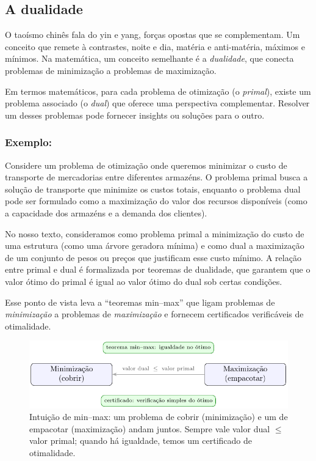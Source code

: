 \subsection{A dualidade}


O taoísmo chinês fala do yin e yang, forças opostas que se complementam. Um conceito que remete à contrastes, noite e dia, matéria e anti-matéria, máximos e mínimos. Na matemática, um conceito semelhante é a \emph{dualidade}, que conecta problemas de minimização a problemas de maximização.


Em termos matemáticos, para cada problema de otimização (o \emph{primal}), existe um problema associado (o \emph{dual}) que oferece uma perspectiva complementar. Resolver um desses problemas pode fornecer insights ou soluções para o outro.

\subsubsection{Exemplo:}
Considere um problema de otimização onde queremos minimizar o custo de transporte de mercadorias entre diferentes armazéns. O problema primal busca a solução de transporte que minimize os custos totais, enquanto o problema dual pode ser formulado como a maximização do valor dos recursos disponíveis (como a capacidade dos armazéns e a demanda dos clientes).


No nosso texto, consideramos como problema primal a minimização do custo de uma estrutura (como uma árvore geradora mínima) e como dual a maximização de um conjunto de pesos ou preços que justificam esse custo mínimo. A relação entre primal e dual é formalizada por teoremas de dualidade, que garantem que o valor ótimo do primal é igual ao valor ótimo do dual sob certas condições.


Esse ponto de vista leva a “teoremas min–max” que ligam problemas de \emph{minimização} a problemas de \emph{maximização} e fornecem certificados verificáveis de otimalidade.


\begin{figure}[H]
	\centering
	\includegraphics[width=0.9\linewidth]{figures/fig_min_max_cert.pdf}

	\caption{Intuição de min--max: um problema de cobrir (minimização) e um de empacotar (maximização) andam juntos. Sempre vale valor dual $\le$ valor primal; quando há igualdade, temos um certificado de otimalidade.}
	\label{fig:min-max-cert}\end{figure}


